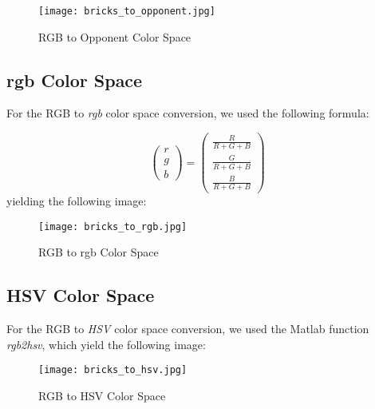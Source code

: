 \documentclass[11pt]{article}
\begin{document}
\begin{figure}[H]
    \centering
    \texttt{[image: bricks\_to\_opponent.jpg]}
    \caption{RGB to Opponent Color Space}
    \label{fig:opponent_color}
\end{figure}


\subsection{rgb Color Space}
For the RGB to \textit{rgb} color space conversion, we used the following formula:

$$
\begin{pmatrix}
	r \\
	g 	\\
	b
\end{pmatrix} = 
\begin{pmatrix}
	\frac{R}{R + G + B}			\\
	\frac{G}{R + G + B}		\\
	\frac{B}{R + G + B}
\end{pmatrix}
$$
yielding the following image:

\begin{figure}[H]
    \centering
    \texttt{[image: bricks\_to\_rgb.jpg]}
    \caption{RGB to rgb Color Space}
    \label{fig:rgb_color}
\end{figure}


\subsection{HSV Color Space}
For the RGB to \textit{HSV} color space conversion, we used the Matlab function \textit{rgb2hsv}, which yield the following image:

\begin{figure}[H]
    \centering
    \texttt{[image: bricks\_to\_hsv.jpg]}
    \caption{RGB to HSV Color Space}
    \label{fig:hsv_color}
\end{figure}
\end{document}
